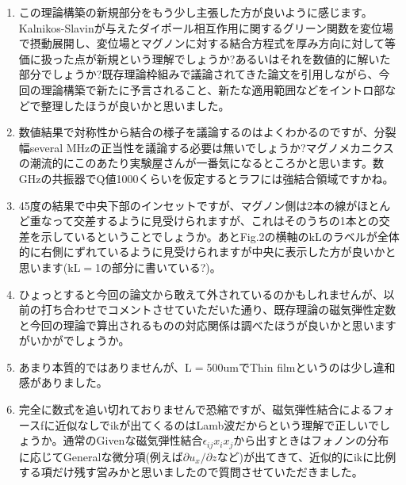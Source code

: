 \documentclass{jsarticle}
\begin{document}
\begin{enumerate}
    \item この理論構築の新規部分をもう少し主張した方が良いように感じます。Kalnikos-Slavinが与えたダイポール相互作用に関するグリーン関数を変位場で摂動展開し、変位場とマグノンに対する結合方程式を厚み方向に対して等価に扱った点が新規という理解でしょうか?あるいはそれを数値的に解いた部分でしょうか?既存理論枠組みで議論されてきた論文を引用しながら、今回の理論構築で新たに予言されること、新たな適用範囲などをイントロ部などで整理したほうが良いかと思いました。
    \item 数値結果で対称性から結合の様子を議論するのはよくわかるのですが、分裂幅several MHzの正当性を議論する必要は無いでしょうか?マグノメカニクスの潮流的にこのあたり実験屋さんが一番気になるところかと思います。数GHzの共振器でQ値1000くらいを仮定するとラフには強結合領域ですかね。
    \item 45度の結果で中央下部のインセットですが、マグノン側は2本の線がほとんど重なって交差するように見受けられますが、これはそのうちの1本との交差を示しているということでしょうか。あとFig.2の横軸のkLのラベルが全体的に右側にずれているように見受けられますが中央に表示した方が良いかと思います(kL$=$1の部分に書いている?)。
    \item ひょっとすると今回の論文から敢えて外されているのかもしれませんが、以前の打ち合わせでコメントさせていただいた通り、既存理論の磁気弾性定数と今回の理論で算出されるものの対応関係は調べたほうが良いかと思いますがいかがでしょうか。
    \item あまり本質的ではありませんが、L$=$500umでThin filmというのは少し違和感がありました。
    \item 完全に数式を追い切れておりませんで恐縮ですが、磁気弾性結合によるフォースfに近似なしでikが出てくるのはLamb波だからという理解で正しいでしょうか。通常のGivenな磁気弾性結合$\epsilon_{ij} x_i x_j$から出すときはフォノンの分布に応じてGeneralな微分項(例えば$\partial u_x/\partial z$など)が出てきて、近似的にikに比例する項だけ残す営みかと思いましたので質問させていただきました。
\end{enumerate}
\end{document}
